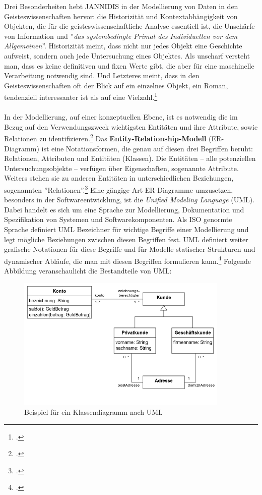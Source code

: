 \documentclass[12pt,a4paper]{article}
\begin{document}
Drei Besonderheiten hebt JANNIDIS in der Modellierung von Daten in den Geisteswissenschaften hervor: die Historizität und Kontextabhängigkeit von Objekten, die für die geisteswissenschaftliche Analyse essentiell ist, die Unschärfe von Information und ''\textit{das systembedingte Primat des Individuellen vor dem Allgemeinen}''. Historizität meint, dass nicht nur jedes Objekt eine Geschichte aufweist, sondern auch jede Untersuchung eines Objektes. Als unscharf versteht man, dass es keine definitiven und fixen Werte gibt, die aber für eine maschinelle Verarbeitung notwendig sind. Und Letzteres meint, dass in den Geisteswissenschaften oft der Blick auf ein einzelnes Objekt, ein Roman, tendenziell interessanter ist als auf eine Vielzahl.\footcite[][S.106-108]{jannidis2017grundlagen}
\\
\\
In der Modellierung, auf einer konzeptuellen Ebene, ist es notwendig die im Bezug auf den Verwendungszweck wichtigsten Entitäten und ihre Attribute, sowie Relationen zu identifizieren.\footcite[][S.102-104]{jannidis2017grundlagen} Das \textbf{Entity-Relationship-Modell} (ER-Diagramm) ist eine Notationsformen, die genau auf diesen drei Begriffen beruht: Relationen, Attributen und Entitäten (Klassen). Die Entitäten -- alle potenziellen Untersuchungsobjekte -- verfügen über Eigenschaften, sogenannte Attribute. Weiters stehen sie zu anderen Entitäten in unterschiedlichen Beziehungen, sogenannten ''Relationen''.\footcite{chen1976entity} Eine gängige Art ER-Diagramme umzusetzen, besonders in der Softwareentwicklung, ist die \textit{Unified Modeling Language} (UML). Dabei handelt es sich um eine Sprache zur Modellierung, Dokumentation und Spezifikation von Systemen und Softwarekomponenten. Als ISO genormte Sprache definiert UML Bezeichner für wichtige Begriffe einer Modellierung und legt mögliche Beziehungen zwischen diesen Begriffen fest. UML definiert weiter grafische Notationen für diese Begriffe und für Modelle statischer Strukturen und dynamischer Abläufe, die man mit diesen Begriffen formulieren kann.\footcite{rumbaugh2004unified} Folgende Abbildung veranschaulicht die Bestandteile von UML:
\begin{figure}[H]
\centering
	\includegraphics[width=0.9\textwidth]{img/uml.png}  
    \caption[Beispiel für ein Klassendiagramm nach UML, \protect\url{de.wikipedia.org/wiki/Unified_Modeling_Language}, 10.06.2019]{Beispiel für ein Klassendiagramm nach UML}\label{fig:uml}
\end{figure} 
\end{document}
